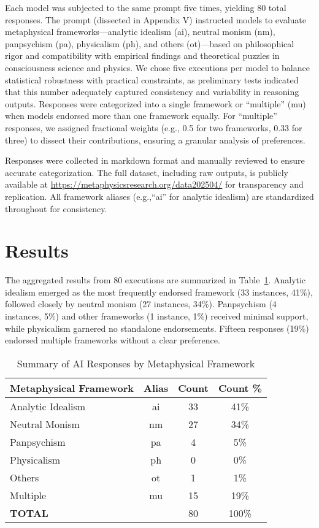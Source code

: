 \documentclass[11pt]{article}
\begin{document}
Each model was subjected to the same prompt five times, yielding 80 total responses. The prompt (dissected in Appendix V) instructed models to evaluate metaphysical frameworks—analytic idealism (ai), neutral monism (nm), panpsychism (pa), physicalism (ph), and others (ot)—based on philosophical rigor and compatibility with empirical findings and theoretical puzzles in consciousness science and physics. We chose five executions per model to balance statistical robustness with practical constraints, as preliminary tests indicated that this number adequately captured consistency and variability in reasoning outputs. Responses were categorized into a single framework or ``multiple'' (mu) when models endorsed more than one framework equally. For ``multiple'' responses, we assigned fractional weights (e.g., 0.5 for two frameworks, 0.33 for three) to dissect their contributions, ensuring a granular analysis of preferences.

Responses were collected in markdown format and manually reviewed to ensure accurate categorization. The full dataset, including raw outputs, is publicly available at \url{https://metaphysicsresearch.org/data202504/} for transparency and replication. All framework aliases (e.g.,``ai'' for analytic idealism) are standardized throughout for consistency.

\section{Results}
The aggregated results from 80 executions are summarized in Table~\ref{tab:summary}. Analytic idealism emerged as the most frequently endorsed framework (33 instances, 41\%), followed closely by neutral monism (27 instances, 34\%). Panpsychism (4 instances, 5\%) and other frameworks (1 instance, 1\%) received minimal support, while physicalism garnered no standalone endorsements. Fifteen responses (19\%) endorsed multiple frameworks without a clear preference.

\begin{table}[ht!]
\centering
\caption{Summary of AI Responses by Metaphysical Framework}
\label{tab:summary}
\begin{tabular}{lccc}
\toprule
\textbf{Metaphysical Framework} & \textbf{Alias} & \textbf{Count} & \textbf{Count \%} \\
\midrule
Analytic Idealism & ai & 33 & 41\% \\
Neutral Monism    & nm & 27 & 34\% \\
Panpsychism       & pa & 4  & 5\%  \\
Physicalism       & ph & 0  & 0\%  \\
Others            & ot & 1  & 1\%  \\
Multiple          & mu & 15 & 19\% \\
\midrule
\textbf{TOTAL}    &    & 80 & 100\% \\
\bottomrule
\end{tabular}
\end{table}
\end{document}
